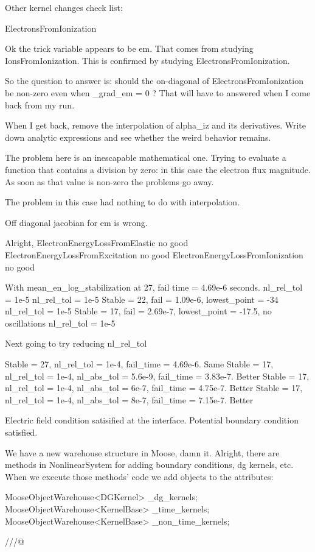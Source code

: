 {Other kernel changes check list:

ElectronsFromIonization

Ok the trick variable appears to be em. That comes from studying IonsFromIonization. This is confirmed by studying ElectronsFromIonization.

So the question to answer is: should the on-diagonal of ElectronsFromIonization be non-zero even when _grad_em = 0 ? That will have to answered when I come back from my run.

When I get back, remove the interpolation of alpha_iz and its derivatives. Write down analytic expressions and see whether the weird behavior remains.

The problem here is an inescapable mathematical one. Trying to evaluate a function that contains a division by zero: in this case the electron flux magnitude. As soon as that value is non-zero the problems go away.

The problem in this case had nothing to do with interpolation.

Off diagonal jacobian for em is wrong.

Alright,
ElectronEnergyLossFromElastic no good
ElectronEnergyLossFromExcitation no good
ElectronEnergyLossFromIonization no good

With mean_en_log_stabilization at 27, fail time = 4.69e-6 seconds. nl_rel_tol = 1e-5
 nl_rel_tol = 1e-5
Stable = 22, fail = 1.09e-6, lowest_point = -34 nl_rel_tol = 1e-5
Stable = 17, fail = 2.69e-7, lowest_point = -17.5, no oscillations nl_rel_tol = 1e-5

Next going to try reducing nl_rel_tol

Stable = 27, nl_rel_tol = 1e-4, fail_time = 4.69e-6.  Same
Stable = 17, nl_rel_tol = 1e-4, nl_abs_tol = 5.6e-9, fail_time = 3.83e-7. Better
Stable = 17, nl_rel_tol = 1e-4, nl_abs_tol = 6e-7, fail_time = 4.75e-7. Better
Stable = 17, nl_rel_tol = 1e-4, nl_abs_tol = 8e-7, fail_time = 7.15e-7. Better

Electric field condition satisified at the interface.
Potential boundary condition satisfied.

We have a new warehouse structure in Moose, damn it. Alright, there are methods in NonlinearSystem for adding boundary conditions, dg kernels, etc. When we execute those methods' code we add objects to the attributes:

  MooseObjectWarehouse<DGKernel> _dg_kernels;
  MooseObjectWarehouse<KernelBase> _time_kernels;
  MooseObjectWarehouse<KernelBase> _non_time_kernels;

  ///@}

